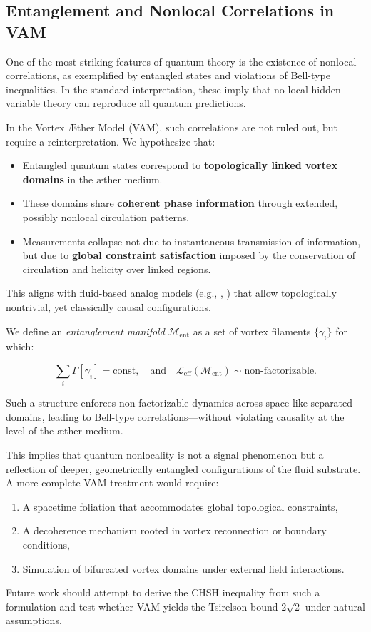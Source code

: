 \subsection{Entanglement and Nonlocal Correlations in VAM}
\label{sec:entanglement}

One of the most striking features of quantum theory is the existence of nonlocal correlations, as exemplified by entangled states and violations of Bell-type inequalities. In the standard interpretation, these imply that no local hidden-variable theory can reproduce all quantum predictions.

In the Vortex Æther Model (VAM), such correlations are not ruled out, but require a reinterpretation. We hypothesize that:

\begin{itemize}
    \item Entangled quantum states correspond to \textbf{topologically linked vortex domains} in the æther medium.
    \item These domains share \textbf{coherent phase information} through extended, possibly nonlocal circulation patterns.
    \item Measurements collapse not due to instantaneous transmission of information, but due to \textbf{global constraint satisfaction} imposed by the conservation of circulation and helicity over linked regions.
\end{itemize}

This aligns with fluid-based analog models (e.g., \cite{volovik2003universe}, \cite{kiehn2005topological}) that allow topologically nontrivial, yet classically causal configurations.

We define an \textit{entanglement manifold} $\mathcal{M}_\text{ent}$ as a set of vortex filaments $\{\gamma_i\}$ for which:

\begin{equation}
    \sum_i \Gamma[\gamma_i] = \text{const}, \quad \text{and} \quad \mathcal{L}_\text{eff}(\mathcal{M}_\text{ent}) \sim \text{non-factorizable}.
\end{equation}

Such a structure enforces non-factorizable dynamics across space-like separated domains, leading to Bell-type correlations—without violating causality at the level of the æther medium.

This implies that quantum nonlocality is not a signal phenomenon but a reflection of deeper, geometrically entangled configurations of the fluid substrate. A more complete VAM treatment would require:
\begin{enumerate}
    \item A spacetime foliation that accommodates global topological constraints,
    \item A decoherence mechanism rooted in vortex reconnection or boundary conditions,
    \item Simulation of bifurcated vortex domains under external field interactions.
\end{enumerate}

Future work should attempt to derive the CHSH inequality from such a formulation and test whether VAM yields the Tsirelson bound \( 2\sqrt{2} \) under natural assumptions.

